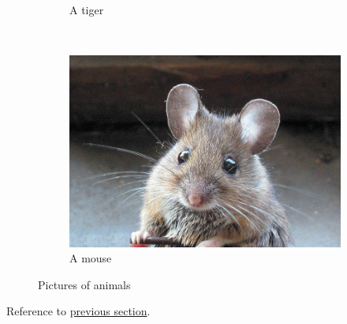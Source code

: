 \documentclass[10pt]{article}
\begin{document}
\begin{figure}
\begin{subfigure}[b]{0.3\textwidth}
    \caption{A tiger}
    \label{fig:tiger}
  \end{subfigure}
  ~ %
  \begin{subfigure}[b]{0.3\textwidth}
    \includegraphics[width=\textwidth]{mouse}
    \caption{A mouse}
    \label{fig:mouse}
  \end{subfigure}
  \caption{Pictures of animals}\label{fig:animals}
\end{figure}

Reference to \hyperref[sec:one]{previous section}.
\end{document}
